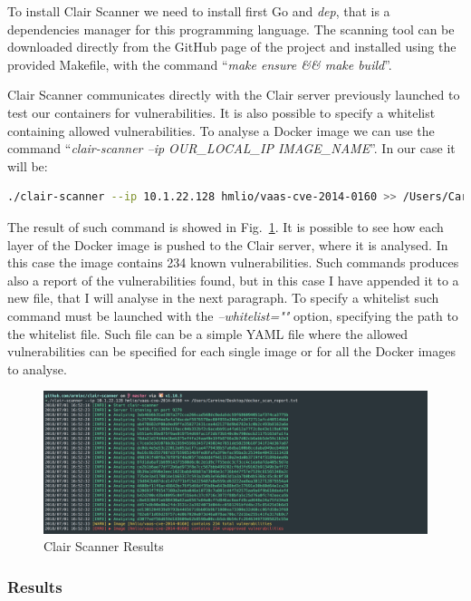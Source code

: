 \documentclass[a4paper,12pt]{article}
\def\myfig#1{Fig.~#1\xspace}
\begin{document}
To install Clair Scanner we need to install first Go and \textit{dep}, that is a
dependencies manager for this programming language. The scanning tool can be
downloaded directly from the GitHub page of the project and installed using the
provided Makefile, with the command ``\textit{make ensure \&\& make build}''.
\par Clair Scanner communicates directly with the Clair server previously
launched to test our containers for vulnerabilities. It is also possible to
specify a whitelist containing allowed vulnerabilities. To analyse a Docker
image we can use the command ``\textit{clair-scanner --ip OUR\_LOCAL\_IP
IMAGE\_NAME}''. In our case it will be:
\begin{lstlisting}[language=bash,breaklines]
  ./clair-scanner --ip 10.1.22.128 hmlio/vaas-cve-2014-0160 >> /Users/Carmine/Desktop/docker_scan_report.txt
\end{lstlisting}
The result of such command is showed in \myfig{\ref{fig:clair_scanner_cmd}}. It
is possible to see how each layer of the Docker image is pushed to the Clair
server, where it is analysed. In this case the image contains 234 known
vulnerabilities. Such commands produces also a report of the vulnerabilities
found, but in this case I have appended it to a new file, that I will analyse in
the next paragraph. To specify a whitelist such command must be launched with
the \textit{--whitelist=""} option, specifying the path to the whitelist file.
Such file can be a simple YAML file where the allowed vulnerabilities can be
specified for each single image or for all the Docker images to analyse.   

\begin{figure}[ht!]
  \centerline{\includegraphics[width=1\textwidth]{clair_scanner_cmd.png}}
  \caption{Clair Scanner Results}
  \label{fig:clair_scanner_cmd}
  \end{figure}

\subsubsection{Results}
\end{document}
